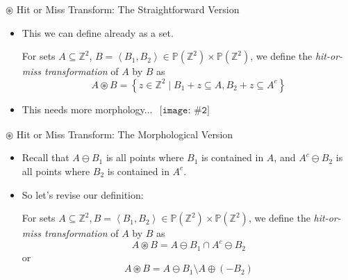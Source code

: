 \documentclass{beamer}
\newcommand{\pic}[2]{
     \begin{array}{l}
      \texttt{[image: \#2]}
      \end{array}
}
\newcommand{\set}[1]{\left\lbrace #1 \right\rbrace}
\newcommand{\buildset}[2]{\set{#1 \mid #2}}
\newcommand{\tuple}[1]{\left\langle #1 \right\rangle}
\newcommand{\intersect}{\cap}
\newcommand{\power}[1]{\mathbb{P}\left(#1\right)}
\newcommand{\dilate}{\oplus}
\newcommand{\erode}{\ominus}
\newcommand{\hitmiss}{\circledast}
\begin{document}
\begin{frame}{$\hitmiss$ Hit or Miss Transform: The Straightforward Version}

  \begin{itemize}
    \item This we can define already as a set.
          \begin{definition}
          For sets $A \subseteq \mathbb{Z}^2$,
                   $B = \tuple{B_1,B_2} \in \power{\mathbb{Z}^2} \times 
                                            \power{\mathbb{Z}^2}$,
          we define the \emph{hit-or-miss transformation} of 
          $A$ by $B$ as
          $$A \hitmiss B = \buildset{z \in \mathbb{Z}^2}
                                    {B_1+z \subseteq A,
                                     B_2+z \subseteq A^c}$$
          \end{definition}
    \item This needs more morphology... $\pic{width=75pt}{images/Walken-Cowbell.jpg}$
  \end{itemize}
\end{frame}

\begin{frame}{$\hitmiss$ Hit or Miss Transform: The Morphological Version}
  \begin{itemize}
   \item 
   Recall that $A \erode B_1$ is all points where $B_1$ is contained
        in $A$, and $A^c \erode B_2$ is all points where $B_2$ is contained
        in $A^c$.
    \item 
    So let's revise our definition:
     \begin{definition}
          For sets $A \subseteq \mathbb{Z}^2,
                    B=\tuple{B_1,B_2}\in \power{\mathbb{Z}^2} \times
                                         \power{\mathbb{Z}^2}$,
          we define the \emph{hit-or-miss transformation} of
          $A$ by $B$ as
          $$A \hitmiss B = A \erode B_1 \intersect A^c \erode B_2$$
          or
          $$A \hitmiss B = A \erode B_1 \setminus A \dilate (-B_2)$$ 
        \end{definition}
   \end{itemize}
\end{frame}
\end{document}
